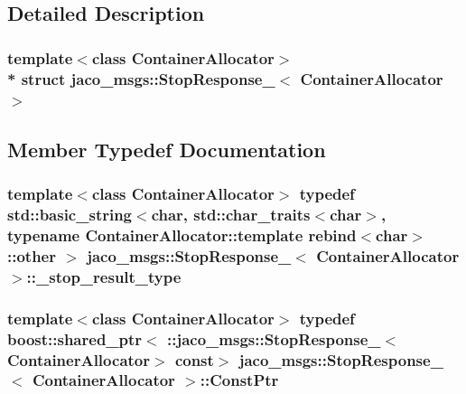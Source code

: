 \subsection{Detailed Description}
\subsubsection*{template$<$class Container\+Allocator$>$\\*
struct jaco\+\_\+msgs\+::\+Stop\+Response\+\_\+$<$ Container\+Allocator $>$}



\subsection{Member Typedef Documentation}
\subsubsection[{\texorpdfstring{\+\_\+stop\+\_\+result\+\_\+type}{_stop_result_type}}]{\setlength{\rightskip}{0pt plus 5cm}template$<$class Container\+Allocator$>$ typedef std\+::basic\+\_\+string$<$char, std\+::char\+\_\+traits$<$char$>$, typename Container\+Allocator\+::template rebind$<$char$>$\+::other $>$ {\bf jaco\+\_\+msgs\+::\+Stop\+Response\+\_\+}$<$ Container\+Allocator $>$\+::{\bf \+\_\+stop\+\_\+result\+\_\+type}}\hypertarget{structjaco__msgs_1_1StopResponse___a26c3d39d10b87a3ce89bd27f50d7b788}{}\label{structjaco__msgs_1_1StopResponse___a26c3d39d10b87a3ce89bd27f50d7b788}
\subsubsection[{\texorpdfstring{Const\+Ptr}{ConstPtr}}]{\setlength{\rightskip}{0pt plus 5cm}template$<$class Container\+Allocator$>$ typedef boost\+::shared\+\_\+ptr$<$ \+::{\bf jaco\+\_\+msgs\+::\+Stop\+Response\+\_\+}$<$Container\+Allocator$>$ const$>$ {\bf jaco\+\_\+msgs\+::\+Stop\+Response\+\_\+}$<$ Container\+Allocator $>$\+::{\bf Const\+Ptr}}\hypertarget{structjaco__msgs_1_1StopResponse___ac6329c392d36e795a755bc9c2fdae72e}{}\label{structjaco__msgs_1_1StopResponse___ac6329c392d36e795a755bc9c2fdae72e}
